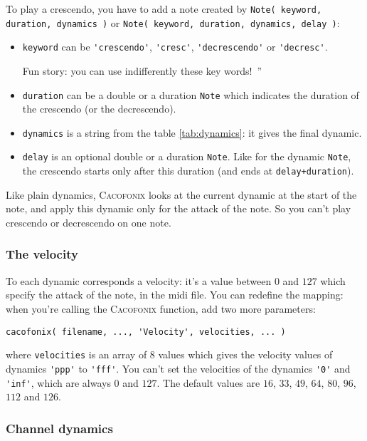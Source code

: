 \documentclass{article}
\newcommand{\cacofonix}{\textsc{Cacofonix}\xspace}
\newcommand{\note}{\lstinline!Note!\xspace}
\newenvironment{meenv}{ \par \noindent \makebox[6em][r]{ \textcolor{mecolor}{Me}: `` --~}}{~''}
\newcommand{\me}[1]{\begin{meenv}#1\end{meenv}}
\begin{document}
To play a crescendo, you have to add a note created by \lstinline!Note( keyword, duration, dynamics )! or \lstinline!Note( keyword, duration, dynamics, delay )!:
\begin{itemize}
  \item \lstinline!keyword! can be \lstinline!'crescendo'!, \lstinline!'cresc'!, \lstinline!'decrescendo'! or \lstinline!'decresc'!.
    \me{Fun story: you can use indifferently these key words!}
  \item \lstinline!duration! can be a double or a duration \note which indicates the duration of the crescendo (or the decrescendo).
  \item \lstinline!dynamics! is a string from the table \ref{tab:dynamics}: it gives the final dynamic.
  \item \lstinline!delay! is an optional double or a duration \note. Like for the dynamic \note, the crescendo starts only after this duration (and ends at \lstinline!delay+duration!).
\end{itemize}

Like plain dynamics, \cacofonix looks at the current dynamic at the start of the note, and apply this dynamic only for the attack of the note. So you can't play crescendo or decrescendo on one note.

\subsubsection{The velocity}
\label{sec:Velocity}

To each dynamic corresponds a velocity: it's a value between $0$ and $127$ which specify the attack of the note, in the midi file. You can redefine the mapping: when you're calling the \cacofonix function, add two more parameters:
\begin{lstlisting}
cacofonix( filename, ..., 'Velocity', velocities, ... )
\end{lstlisting}
where \lstinline!velocities! is an array of $8$ values which gives the velocity values of dynamics \lstinline!'ppp'! to \lstinline!'fff'!. You can't set the velocities of the dynamics \lstinline!'0'! and \lstinline!'inf'!, which are always $0$ and $127$. The default values are $16$, $33$, $49$, $64$, $80$, $96$, $112$ and $126$.

\subsubsection{Channel dynamics}
\label{sec:ChannelDynamics}
\end{document}
